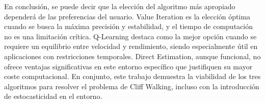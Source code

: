 En conclusión, se puede decir que la elección del algoritmo más apropiado dependerá de las preferencias del usuario. Value Iteration es la elección óptima cuando se busca la máxima precisión y estabilidad, y el tiempo de computación no es una limitación crítica. Q-Learning destaca como la mejor opción cuando se requiere un equilibrio entre velocidad y rendimiento, siendo especialmente útil en aplicaciones con restricciones temporales. Direct Estimation, aunque funcional, no ofrece ventajas significativas en este entorno específico que justifiquen su mayor coste computacional. En conjunto, este trabajo demuestra la viabilidad de los tres algoritmos para resolver el problema de Cliff Walking, incluso con la introducción de estocasticidad en el entorno.
